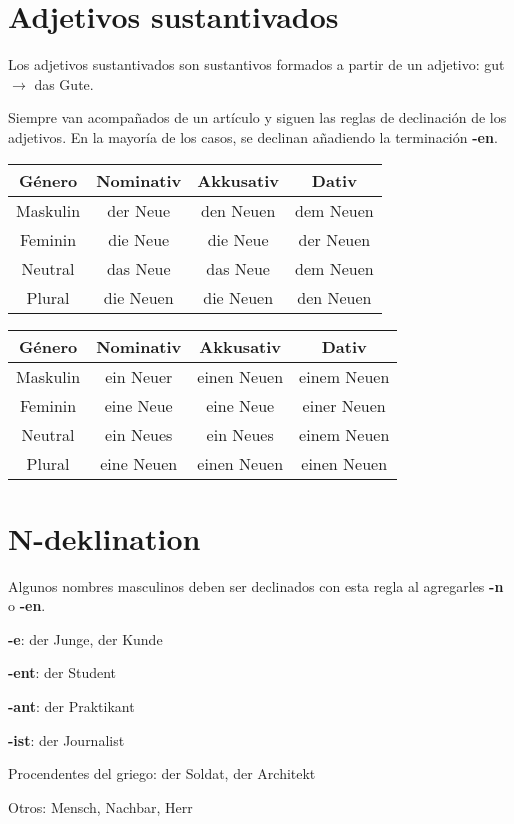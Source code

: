 \section{Adjetivos sustantivados}
Los adjetivos sustantivados son sustantivos formados a partir de un adjetivo: gut $\rightarrow$ das Gute.

Siempre van acompañados de un artículo y siguen las reglas de declinación de los adjetivos. En la mayoría de los casos, se declinan añadiendo la terminación \textbf{-en}.

\begin{tabular}{|c | c | c | c |}
\hline
\textbf{Género} & \textbf{Nominativ} & \textbf{Akkusativ} & \textbf{Dativ}\\
\hline
Maskulin & der Neue  & den Neuen & dem Neuen \\
Feminin  & die Neue  & die Neue  & der Neuen \\
Neutral  & das Neue  & das Neue  & dem Neuen \\
Plural   & die Neuen & die Neuen & den Neuen \\
\hline
\end{tabular}

\begin{tabular}{|c | c | c | c |}
\hline
\textbf{Género} & \textbf{Nominativ} & \textbf{Akkusativ} & \textbf{Dativ}\\
\hline
Maskulin & ein Neuer  &  einen Neuen & einem Neuen \\
Feminin  & eine Neue  &  eine Neue   & einer Neuen \\
Neutral  & ein Neues  &  ein Neues   & einem Neuen \\
Plural   & eine Neuen &  einen Neuen & einen Neuen \\
\hline
\end{tabular}

\section{N-deklination}

Algunos nombres masculinos deben ser declinados con esta regla al agregarles \textbf{-n} o \textbf{-en}.
\begin{myitemize}
\item \textbf{-e}: der Junge, der Kunde
\item \textbf{-ent}: der Student
\item \textbf{-ant}: der Praktikant
\item \textbf{-ist}: der Journalist
\item Procendentes del griego: der Soldat, der Architekt
\item Otros: Mensch, Nachbar, Herr
\end{myitemize}

